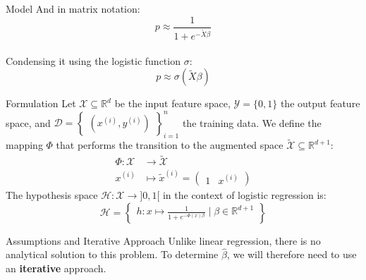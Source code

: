\begin{frame}{Model}
	And in matrix notation:
	\begin{equation}
		p \approx \frac{1}{1 + e^{\displaystyle -\tilde{X} \beta}}
		\nonumber
	\end{equation} \\
	\vspace{0.5cm}
	Condensing it using the logistic function $\sigma$:
	\begin{equation}
		p \approx \sigma\left(\tilde{X} \beta\right)
		\nonumber
	\end{equation}
\end{frame}

\begin{frame}{Formulation}
	Let $\mathcal{X} \subseteq \mathbb{R}^d$ be the input feature space, $\mathcal{Y} = \{0, 1\}$ the output feature space, and $\mathcal{D} = \begin{Bmatrix}(x^{(i)}, y^{(i)})\end{Bmatrix}_{i=1}^n$ the training data. We define the mapping $\Phi$ that performs the transition to the augmented space $\tilde{\mathcal{X}} \subseteq \mathbb{R}^{d+1}$:
	\begin{equation}
		\begin{aligned}
			\Phi: \mathcal{X} &\to \tilde{\mathcal{X}} \\
			x^{(i)} &\mapsto \tilde{x}^{(i)} = \begin{pmatrix}1 & x^{(i)}\end{pmatrix}
			\nonumber
		\end{aligned}
	\end{equation}
	The hypothesis space $\mathcal{H}: \mathcal{X} \to ]0, 1[$ in the context of logistic regression is:
	\begin{equation}
		\mathcal{H} = \begin{Bmatrix}h: x \mapsto \displaystyle \frac{1}{1 + e^{-\Phi(x) \beta}} \mid \beta \in \mathbb{R}^{d+1}\end{Bmatrix}
		\nonumber
	\end{equation}
\end{frame}

\begin{frame}{Assumptions and Iterative Approach}
	Unlike linear regression, there is no analytical solution to this problem. To determine $\hat{\beta}$, we will therefore need to use an \textbf{iterative} approach. \\
\end{frame}

